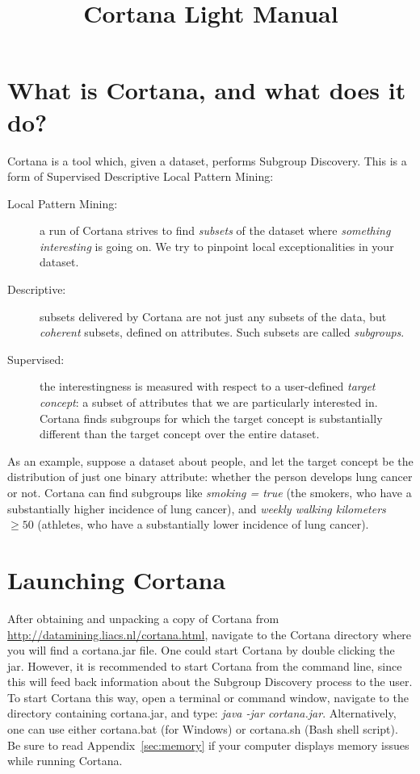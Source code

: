 \documentclass{article}
\title{Cortana Light Manual}
\author{}
\date{}
\begin{document}
\maketitle
\vspace{-2cm}
\section{What is Cortana, and what does it do?}
\label{sec:intro}

Cortana is a tool which, given a dataset, performs Subgroup Discovery. This
is a form of Supervised Descriptive Local Pattern Mining:
\begin{description}
\item[Local Pattern Mining:] a run of Cortana strives to find \emph{subsets}
of the dataset where \emph{something interesting} is going on. We try to
pinpoint local exceptionalities in your dataset.
\item[Descriptive:] subsets delivered by Cortana are not just any subsets of
the data, but \emph{coherent} subsets, defined on attributes. Such subsets
are called \emph{subgroups}.
\item[Supervised:] the interestingness is measured with respect to a
user-defined \emph{target concept}: a subset of attributes that we are
particularly interested in. Cortana finds subgroups for which the target
concept is substantially different than the target concept over the entire
dataset.
\end{description}

As an example,
suppose a dataset about people, and let the target concept be the
distribution of just one binary attribute: whether the person develops lung
cancer or not.  Cortana can find subgroups like \emph{smoking = true} (the
smokers, who have a substantially higher incidence of lung cancer), and
\emph{weekly walking kilometers} $\geq 50$ (athletes, who have a
substantially lower incidence of lung cancer).

\section{Launching Cortana}

After obtaining and unpacking a copy of Cortana from
\url{http://datamining.liacs.nl/cortana.html}, navigate to the Cortana
directory where you will find a cortana.jar file.  One could start Cortana
by double clicking the jar.  However, it is recommended to start Cortana
from the command line, since this will feed back information about the
Subgroup Discovery process to the user.  To start Cortana this way, open a
terminal or command window, navigate to the directory containing
cortana.jar, and type: \emph{java -jar cortana.jar}.  Alternatively, one can
use either cortana.bat (for Windows) or cortana.sh (Bash shell script).  Be
sure to read Appendix~\ref{sec:memory} if your computer displays memory
issues while running Cortana.
\end{document}
